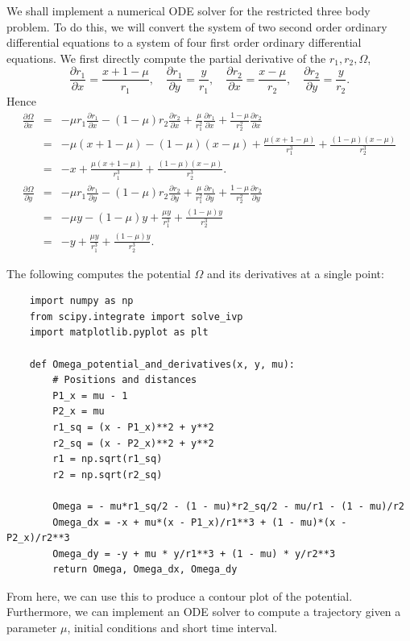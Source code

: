 \documentclass{article}
\newcommand{\pder}[2][]{\frac{\partial#1}{\partial#2}}
\begin{document}
We shall implement a numerical ODE solver for the restricted three body problem. To do this, we will convert the system of two second order ordinary differential equations to a system of four first order ordinary differential equations. We first directly compute the partial derivative of the \(r_1, r_2, \Omega\),
\[ \pder[r_1]{x} = \frac{x+1 - \mu}{r_1}, \quad \pder[r_1]{y} = \frac{y}{r_1}, \quad \pder[r_2]{x} = \frac{x-\mu}{r_2}, \quad \pder[r_2]{y} = \frac{y}{r_2}. \]
Hence
\begin{eqnarray*}
    \pder[\Omega]{x} & = & -\mu r_1\pder[r_1]{x} - (1-\mu)r_2\pder[r_2]{x} + \frac{\mu}{r_1^2}\pder[r_1]{x} + \frac{1-\mu}{r_2^2}\pder[r_2]{x} \\
                     & = & -\mu(x+1-\mu) - (1-\mu)(x-\mu) + \frac{\mu(x+1-\mu)}{r_1^3} + \frac{(1-\mu)(x-\mu)}{r_2^3} \\
                     & = & -x + \frac{\mu(x+1-\mu)}{r_1^3} + \frac{(1-\mu)(x-\mu)}{r_2^3}.\\
    \pder[\Omega]{y} & = & -\mu r_1\pder[r_1]{y} - (1-\mu)r_2\pder[r_2]{y} + \frac{\mu}{r_1^2}\pder[r_1]{y} + \frac{1-\mu}{r_2^2}\pder[r_2]{y} \\
                     & = & -\mu y - (1-\mu)y + \frac{\mu y}{r_1^3} + \frac{(1-\mu)y}{r_2^3} \\
                     & = & -y + \frac{\mu y}{r_1^3} + \frac{(1-\mu)y}{r_2^3}.
\end{eqnarray*}

The following computes the potential \(\Omega\) and its derivatives at a single point:

\begin{verbatim}
    import numpy as np
    from scipy.integrate import solve_ivp
    import matplotlib.pyplot as plt
    
    def Omega_potential_and_derivatives(x, y, mu):
        # Positions and distances
        P1_x = mu - 1
        P2_x = mu
        r1_sq = (x - P1_x)**2 + y**2
        r2_sq = (x - P2_x)**2 + y**2
        r1 = np.sqrt(r1_sq)
        r2 = np.sqrt(r2_sq)
    
        Omega = - mu*r1_sq/2 - (1 - mu)*r2_sq/2 - mu/r1 - (1 - mu)/r2
        Omega_dx = -x + mu*(x - P1_x)/r1**3 + (1 - mu)*(x - P2_x)/r2**3
        Omega_dy = -y + mu * y/r1**3 + (1 - mu) * y/r2**3
        return Omega, Omega_dx, Omega_dy
\end{verbatim}

From here, we can use this to produce a contour plot of the potential. Furthermore, we can implement an ODE solver to compute a trajectory given a parameter \(\mu\), initial conditions and short time interval.
\end{document}
